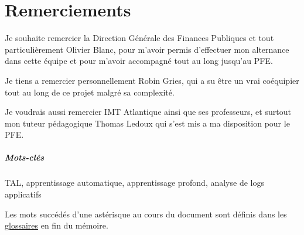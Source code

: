 \documentclass[openany, 11pt]{memoir}
\newcommand\chapters[1]{
	\chapter*{#1}
	\addcontentsline{toc}{chapter}{#1}
}
\begin{document}
\newpage
{}
\tableofcontents
{}

\newpage
\chapters{Remerciements}
Je souhaite remercier la Direction Générale des Finances Publiques et tout particulièrement Olivier Blanc, pour m'avoir permis d'effectuer mon alternance dans cette équipe et pour m'avoir accompagné tout au long jusqu'au PFE.

\bigskip
Je tiens a remercier personnellement Robin Gries, qui a su être un vrai coéquipier tout au long de ce projet malgré sa complexité.

\bigskip
Je voudrais aussi remercier IMT Atlantique ainsi que ses professeurs, et surtout mon tuteur pédagogique Thomas Ledoux qui s'est mis a ma disposition pour le PFE.

\newpage
\begin{abstract}
Les \glspl{log} sont une source importante de données détaillant le fonctionnement interne d'une application, mais ne sont pourtant que rarement utilisés a leur plein potentiel. Dans ce mémoire, je vais détailler le processus d'évolution d'un outil d'\gls{ml} qui utilise les \glspl{log} pour détecter et même tenter de prévoir des anomalies logicielles.
\end{abstract}


{ 
\begin{abstract}
\Glspl{log} are an important source of data when it comes to the internal workings of software, but they are rarely used to their full potential. In this memoir, I will explain the evolution of a machine learning tool which uses \glspl{log} to detect and even attempt to predict software anomalies.
\end{abstract}}

\paragraph{Mots-clés}
\gls{TAL}, apprentissage automatique, apprentissage profond, analyse de logs applicatifs

\newpage
\begin{center}
	\vspace*{\fill}
	Les mots succédés d'une astérisque au cours du document sont définis dans les \hyperref[glos]{glossaires} en fin du mémoire.
    \vspace*{\fill}
\end{center}
\end{document}

